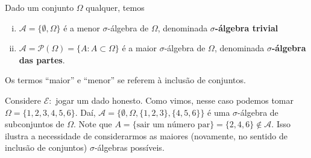 \documentclass[../Notas.tex]{subfiles}
\begin{document}
\begin{remarks}
Dado um conjunto $\Omega$ qualquer, temos
\begin{enumerate}[(i)]
    \item $\mathcal{A} = \{ \emptyset, \Omega \}$ é a menor $\sigma$-álgebra de $\Omega$, denominada {\bf $\sigma$-álgebra trivial}
    \item $\mathcal{A} = \mathcal{P}(\Omega) = \{ A : A\subset\Omega \}$ é a maior $\sigma$-álgebra de $\Omega$, denominada {\bf $\sigma$-álgebra das partes}.
\end{enumerate}
Os termos ``maior'' e ``menor'' se referem à inclusão de conjuntos.
\end{remarks}

\begin{example}
Considere $\mathcal{E}:$ jogar um dado honesto. Como vimos, nesse caso podemos tomar $\Omega = \{ 1,2,3,4,5,6 \}$. Daí, $\mathcal{A} = \{ \emptyset, \Omega, \{1,2,3\}, \{4,5,6\} \}$ é uma $\sigma$-álgebra de subconjuntos de $\Omega$. Note que $A = \{ \text{sair um número par} \} = \{2,4,6\}\notin\mathcal{A}$. Isso ilustra a necessidade de considerarmos as maiores (novamente, no sentido de inclusão de conjuntos) $\sigma$-álgebras possíveis.
\end{example}
\end{document}
